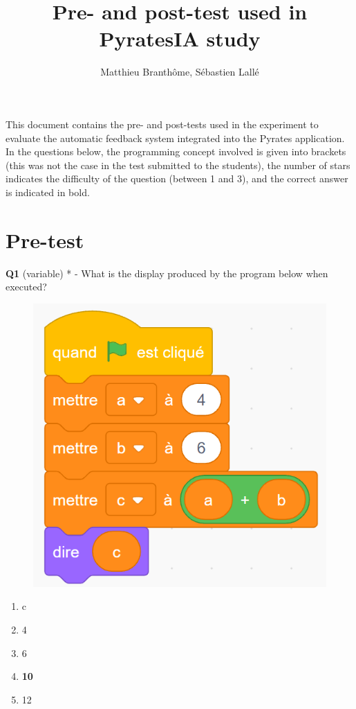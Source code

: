 \documentclass[14pt]{extarticle}
\title{Pre- and post-test used in PyratesIA study}  %
\author{Matthieu Branth\^ome, S\'ebastien Lall\'e}
\date{}
\begin{document}
\maketitle
This document contains the pre- and post-tests used in the experiment to evaluate the automatic feedback system integrated into the Pyrates application. In the questions below, the programming concept involved is given into brackets (this was not the case in the test submitted to the students), the number of stars indicates the difficulty of the question (between 1 and 3), and the correct answer is indicated in bold.

\section{Pre-test}

\textbf{Q1} (variable) * - What is the display produced by the program below when executed?
\begin{figure}[H]
    \centering
    \includegraphics[width=0.5\linewidth]{images/pretest/_Q1.png}
\end{figure}

\begin{enumerate}[label=\alph*)]
    \item c
    \item 4
    \item 6
    \item \textbf{10}
    \item 12
\end{enumerate}
\newpage
\end{document}
